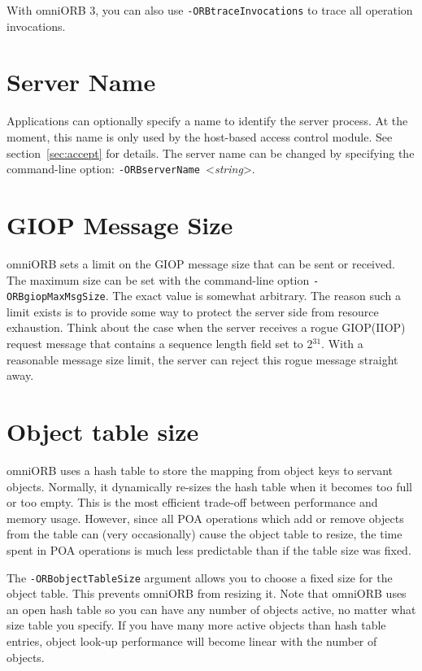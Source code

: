 \documentclass[11pt,twoside,a4paper]{book}
\newcommand{\cmdline}[1]{\texttt{#1}}
\begin{document}
\noindent With omniORB 3, you can also use
\cmdline{-ORBtraceInvocations} to trace all operation invocations.


\section{Server Name}
\label{sec:servername}

Applications can optionally specify a name to identify the server
process. At the moment, this name is only used by the host-based
access control module. See section~\ref{sec:accept} for details. The
server name can be changed by specifying the command-line option:
\cmdline{-ORBserverName }<\textit{string}>.


\section{GIOP Message Size}
\label{sec:giopmsg}

omniORB sets a limit on the GIOP message size that can be sent or
received. The maximum size can be set with the command-line option
\cmdline{-ORBgiopMaxMsgSize}.  The exact value is somewhat
arbitrary. The reason such a limit exists is to provide some way to
protect the server side from resource exhaustion. Think about the case
when the server receives a rogue GIOP(IIOP) request message that
contains a sequence length field set to 2$^{31}$. With a reasonable
message size limit, the server can reject this rogue message straight
away.


\section{Object table size}
\label{sec:objtable}

omniORB uses a hash table to store the mapping from object keys to
servant objects. Normally, it dynamically re-sizes the hash table when
it becomes too full or too empty. This is the most efficient trade-off
between performance and memory usage. However, since all POA
operations which add or remove objects from the table can (very
occasionally) cause the object table to resize, the time spent in POA
operations is much less predictable than if the table size was fixed.

The \cmdline{-ORBobjectTableSize} argument allows you to choose a
fixed size for the object table. This prevents omniORB from resizing
it. Note that omniORB uses an open hash table so you can have any
number of objects active, no matter what size table you specify. If
you have many more active objects than hash table entries, object
look-up performance will become linear with the number of objects.
\end{document}
